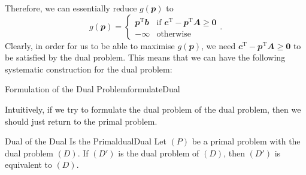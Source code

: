 \documentclass[math, code]{amznotes}
\theoremstyle{remark}
\begin{document}
Therefore, we can essentially reduce $g(\mathbfit{p})$ to 
\begin{equation*}
    g(\mathbfit{p}) = \begin{cases}
        \mathbfit{p}^{\mathrm{T}}\mathbfit{b} & \textrm{if } \mathbfit{c}^{\mathrm{T}} - \mathbfit{p}^{\mathrm{T}}\mathbfit{A} \geq \mathbf{0} \\
        -\infty & \textrm{otherwise}
    \end{cases}.
\end{equation*}
Clearly, in order for us to be able to maximise $g(\mathbfit{p})$, we need $\mathbfit{c}^{\mathrm{T}} - \mathbfit{p}^{\mathrm{T}}\mathbfit{A} \geq \mathbf{0}$ to be satisfied by the dual problem. This means that we can have the following systematic construction for the dual problem:
\begin{tecbox}{Formulation of the Dual Problem}{formulateDual}
    
\end{tecbox}
Intuitively, if we try to formulate the dual problem of the dual problem, then we should just return to the primal problem.
\begin{probox}{Dual of the Dual Is the Primal}{dualDual}
    Let $(P)$ be a primal problem with the dual problem $(D)$. If $(D')$ is the dual problem of $(D)$, then $(D')$ is equivalent to $(D)$.
\end{probox}
\end{document}
